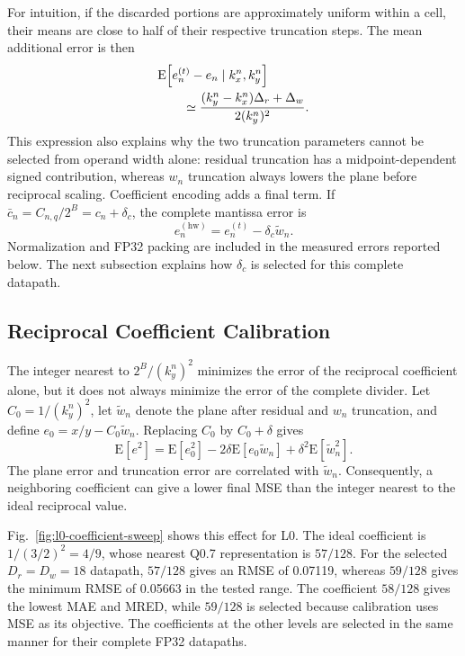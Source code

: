 \documentclass[conference]{IEEEtran}
\begin{document}
For intuition, if the discarded portions are approximately uniform within a
cell, their means are close to half of their respective truncation steps. The
mean additional error is then
\begin{equation}
\begin{aligned}
 &\mathrm{E}\!\left[e_n^{(t)}-e_n\mid k_x^n,k_y^n\right]\\
 &\qquad\simeq {(k_y^n-k_x^n)\Delta_r+\Delta_w
                 \over2(k_y^n)^2}.
\end{aligned}
 \label{eq:divider_mean_truncation_error}
\end{equation}
This expression also explains why the two truncation parameters cannot be
selected from operand width alone: residual truncation has a midpoint-dependent
signed contribution, whereas $w_n$ truncation always lowers the plane before
reciprocal scaling. Coefficient encoding adds a final term. If
$\bar c_n=C_{n,q}/2^B=c_n+\delta_c$, the complete mantissa error is
\begin{equation}
 e_n^{(\mathrm{hw})}=e_n^{(t)}-\delta_c\widetilde w_n.
 \label{eq:divider_complete_error}
\end{equation}
Normalization and FP32 packing are included in the measured errors reported
below. The next subsection explains how $\delta_c$ is selected for this
complete datapath.

\subsection{Reciprocal Coefficient Calibration}
The integer nearest to $2^B/(k_y^n)^2$ minimizes the error of the reciprocal
coefficient alone, but it does not always minimize the error of the complete divider.
Let $C_0=1/(k_y^n)^2$, let $\widetilde w_n$ denote the plane after residual and
$w_n$ truncation, and define $e_0=x/y-C_0\widetilde w_n$. Replacing $C_0$ by
$C_0+\delta$ gives
\begin{equation}
 \mathrm{E}[e^2]=\mathrm{E}[e_0^2]
 -2\delta\mathrm{E}[e_0\widetilde w_n]
 +\delta^2\mathrm{E}[\widetilde w_n^2].
 \label{eq:coefficient_calibration}
\end{equation}
The plane error and truncation error are correlated with $\widetilde w_n$.
Consequently, a neighboring coefficient can give a lower final MSE than the
integer nearest to the ideal reciprocal value.

Fig.~\ref{fig:l0-coefficient-sweep} shows this effect for L0. The ideal
coefficient is $1/(3/2)^2=4/9$, whose nearest Q0.7 representation is $57/128$.
For the selected $D_r=D_w=18$ datapath, $57/128$ gives an RMSE of 0.07119,
whereas $59/128$ gives the minimum RMSE of 0.05663 in the tested range.
The coefficient $58/128$ gives the lowest MAE and MRED, while $59/128$ is
selected because calibration uses MSE as its objective. The coefficients at
the other levels are selected in the same manner for their complete FP32
datapaths.
\end{document}
